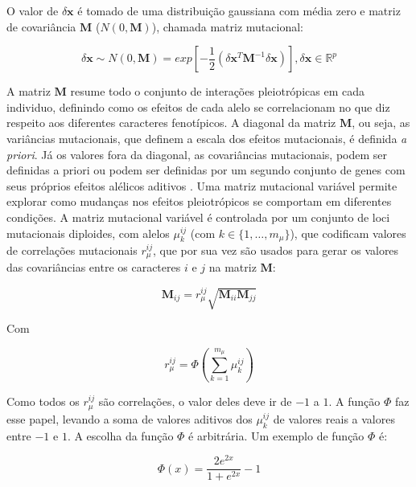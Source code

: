 O valor de $\delta \mathbf{x}$ é tomado de uma distribuição gaussiana com média
zero e matriz de covariância $\mathbf{M}$ ($N(0, \mathbf{M})$), chamada matriz mutacional:

\begin{equation}
    \delta \mathbf{x} \sim N(0, \mathbf{M}) = exp \left[-\frac{1}{2} (\delta \mathbf{x}^T \mathbf{M}^{-1} \delta \mathbf{x})\right] , \delta \mathbf{x} \in \mathbb{R}^p
\end{equation}

A matriz $\mathbf{M}$ resume todo o conjunto de interações pleiotrópicas em cada
individuo, definindo como os efeitos de cada alelo se correlacionam no
que diz respeito aos diferentes caracteres fenotípicos.
A diagonal da matriz $\mathbf{M}$, ou seja, as variâncias mutacionais, que
definem a escala dos efeitos mutacionais, é definida {\it a priori}.
Já os valores fora da diagonal, as covariâncias mutacionais, podem ser
definidas a priori \citep{Jones2003, Jones2004} ou podem ser definidas
por um segundo conjunto de genes com seus próprios efeitos alélicos
aditivos \citep{Jones2007}.
Uma matriz mutacional variável permite explorar como mudanças nos
efeitos pleiotrópicos se comportam em diferentes condições.
A matriz mutacional variável é controlada por um conjunto de loci
mutacionais diploides, com alelos $\mu^{ij}_k$ (com $k \in \{1,\ldots,m_\mu\}$),
que codificam valores de correlações mutacionais $r_\mu^{ij}$, que por
sua vez são usados para gerar os valores das covariâncias entre os
caracteres $i$ e $j$ na matriz $\mathbf{M}$:

\begin{equation}
    \mathbf{M}_{ij} = r_\mu^{ij} \sqrt {\mathbf{M}_{ii}\mathbf{M}_{jj}}
\end{equation}

Com

\begin{equation}
r_\mu^{ij} = \Phi \left(\sum_{k=1}^{m_\mu} \mu^{ij}_k\right)
\end{equation}

Como todos os $r_\mu^{ij}$ são correlações, o valor deles deve ir de
$-1$ a $1$.
A função $\Phi$ faz esse papel, levando a soma de valores
aditivos dos $\mu^{ij}_k$ de valores reais a valores entre $-1$ e $1$.
A escolha da função $\Phi$ é arbitrária.
Um exemplo de função $\Phi$ \citep[usado em][]{Jones2007} é:

\begin{equation}
\Phi (x) = \frac{2e^{2x}}{1+e^{2x}} - 1
\end{equation}

